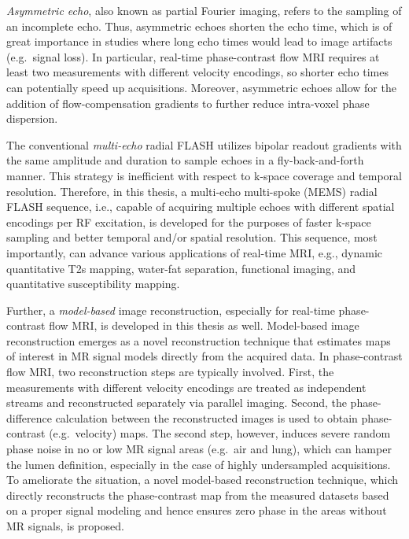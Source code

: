 \textit{Asymmetric echo}, also known as partial Fourier imaging, refers to the sampling of an incomplete echo. Thus, asymmetric echoes shorten the echo time, which is of great importance in studies where long echo times would lead to image artifacts (e.g.~signal loss). In particular, real-time phase-contrast flow MRI requires at least two measurements with different velocity encodings, so shorter echo times can potentially speed up acquisitions. Moreover, asymmetric echoes allow for the addition of flow-compensation gradients to further reduce intra-voxel phase dispersion.

The conventional \textit{multi-echo} radial FLASH utilizes bipolar readout gradients with the same amplitude and duration to sample echoes in a fly-back-and-forth manner. This strategy is inefficient with respect to k-space coverage and temporal resolution. Therefore, in this thesis, a multi-echo multi-spoke (\acs{MEMS}) radial FLASH sequence, i.e., capable of acquiring multiple echoes with different spatial encodings per RF excitation, is developed for the purposes of faster k-space sampling and better temporal and/or spatial resolution. This sequence, most importantly, can advance various applications of real-time MRI, e.g., dynamic quantitative \acs{T2s} mapping, water-fat separation, functional imaging, and quantitative susceptibility mapping.

Further, a \textit{model-based} image reconstruction, especially for real-time phase-contrast flow MRI, is developed in this thesis as well. Model-based image reconstruction emerges as a novel reconstruction technique that estimates maps of interest in MR signal models directly from the acquired data. In phase-contrast flow MRI, two reconstruction steps are typically involved. First, the measurements with different velocity encodings are treated as independent streams and reconstructed separately via parallel imaging. Second, the phase-difference calculation between the reconstructed images is used to obtain phase-contrast (e.g.~velocity) maps. The second step, however, induces severe random phase noise in no or low MR signal areas (e.g.~air and lung), which can hamper the lumen definition, especially in the case of highly undersampled acquisitions. To ameliorate the situation, a novel model-based reconstruction technique, which directly reconstructs the phase-contrast map from the measured datasets based on a proper signal modeling and hence ensures zero phase in the areas without MR signals, is proposed.


